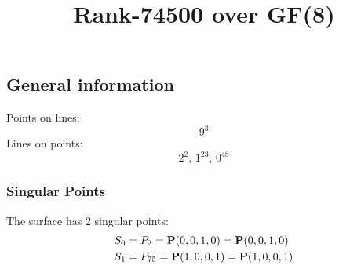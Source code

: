 \documentclass{article}
\newcommand\setTBstruts{\def\T{\rule{0pt}{2.6ex}}%
\def\B{\rule[-1.2ex]{0pt}{0pt}}}
\newcommand{\bP}{{\bf P}}
\begin{document}
 
\setTBstruts



{\allowdisplaybreaks%






\title{Rank-74500 over GF(8)}
\author{}%
\maketitle%
%
{}



\subsection*{General information}
Points on lines:
$$
9^3$$
Lines on points:
$$
2^2,\,1^{23},\,0^{48}$$
\subsubsection*{Singular Points}
The surface has 2 singular points:\\
\begin{align*}
S_{0} &= P_{2}=\bP(0, 0, 1, 0) = \bP(0, 0, 1, 0)\\
S_{1} &= P_{75}=\bP(1, 0, 0, 1) = \bP(1, 0, 0, 1)\\
\end{align*}
}
\end{document}
